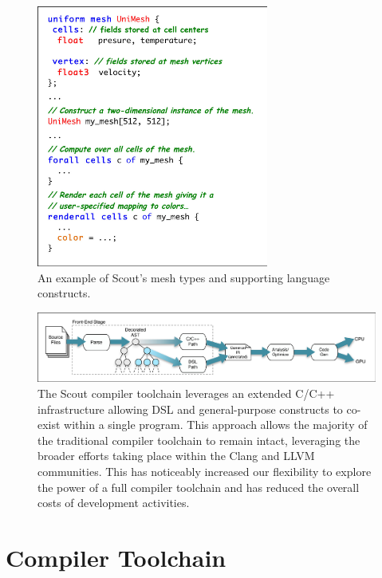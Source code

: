 \documentclass{tcvg}
\begin{document}
	\begin{figure}[b!]
		\centering
		\includegraphics[width=3.00in]{figures/source-fig-v2.pdf}
		\caption{An example of Scout's mesh types and supporting language constructs.}
	\label{fig:source}
   \end{figure}

 \begin{figure}[ht]
		\centering
		\includegraphics[width=7in]{figures/toolchain-v2.pdf}
		\caption{The Scout compiler toolchain leverages an extended
          C/C++ infrastructure allowing DSL and general-purpose 
          constructs to co-exist within a single program.  This 
          approach allows the majority of the traditional compiler 
          toolchain to remain intact, leveraging the broader efforts 
          taking place within the Clang and LLVM communities.  This
          has noticeably increased our flexibility to explore 
          the power of a full compiler toolchain and has 
          reduced the overall costs of development activities.}
	\label{fig:toolchain}
    \end{figure}

  \section*{Compiler Toolchain}
\end{document}
